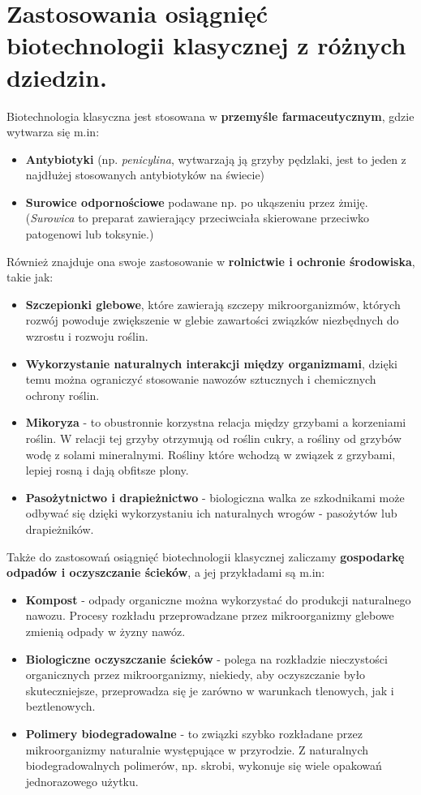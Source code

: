 \documentclass[a4paper, twocolumn]{article}
\begin{document}
\section{Zastosowania osiągnięć biotechnologii klasycznej z różnych dziedzin.}%
\label{sec:Zastosowania osiągnięć biotechnologii klasycznej z różnych dziedzin.}
Biotechnologia klasyczna jest stosowana w \textbf{przemyśle farmaceutycznym}, gdzie wytwarza się m.in:
\begin{itemize}
	\item \textbf{Antybiotyki} (np. \textit{penicylina}, wytwarzają ją grzyby pędzlaki, jest to jeden z najdłużej stosowanych antybiotyków na świecie)
	\item \textbf{Surowice odpornościowe} podawane np. po ukąszeniu przez żmiję. (\textit{Surowica} to preparat zawierający przeciwciała skierowane przeciwko patogenowi lub toksynie.)
\end{itemize}
Również znajduje ona swoje zastosowanie w \textbf{rolnictwie i ochronie środowiska}, takie jak:
\begin{itemize}
	\item \textbf{Szczepionki glebowe}, które zawierają szczepy mikroorganizmów, których rozwój powoduje zwiększenie w glebie zawartości związków niezbędnych do wzrostu i rozwoju roślin.
	\item \textbf{Wykorzystanie naturalnych interakcji między organizmami}, dzięki temu można ograniczyć stosowanie nawozów sztucznych i chemicznych ochrony roślin.
	\item \textbf{Mikoryza} - to obustronnie korzystna relacja między grzybami a korzeniami roślin.
		W relacji tej grzyby otrzymują od roślin cukry, a rośliny od grzybów wodę z solami mineralnymi.
		Rośliny które wchodzą w związek z grzybami, lepiej rosną i dają obfitsze plony.
	\item \textbf{Pasożytnictwo i drapieżnictwo} - biologiczna walka ze szkodnikami może odbywać się dzięki wykorzystaniu ich naturalnych wrogów - pasożytów lub drapieżników.
\end{itemize}
Także do zastosowań osiągnięć biotechnologii klasycznej zaliczamy \textbf{gospodarkę odpadów i oczyszczanie ścieków}, a jej przykładami są m.in:
\begin{itemize}
	\item \textbf{Kompost} - odpady organiczne można wykorzystać do produkcji naturalnego nawozu.
		Procesy rozkładu przeprowadzane przez mikroorganizmy glebowe zmienią odpady w żyzny nawóz.
	\item \textbf{Biologiczne oczyszczanie ścieków} - polega na rozkładzie nieczystości organicznych przez mikroorganizmy, niekiedy, aby oczyszczanie było skuteczniejsze, przeprowadza się je zarówno w warunkach tlenowych, jak i beztlenowych.
	\item \textbf{Polimery biodegradowalne} - to związki szybko rozkładane przez mikroorganizmy naturalnie występujące w przyrodzie.
		Z naturalnych biodegradowalnych polimerów, np. skrobi, wykonuje się wiele opakowań jednorazowego użytku.
\end{itemize}
\end{document}
